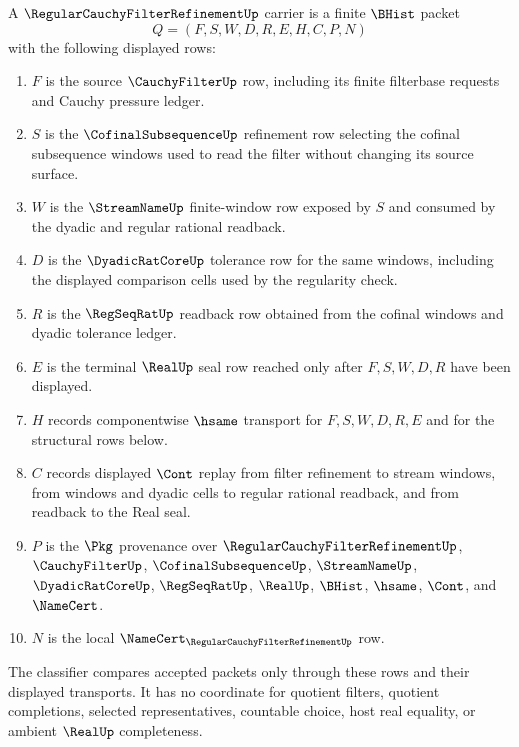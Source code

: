 \begin{definition}
\label{def:regular-cauchy-filter-refinement-carrier}
A $\RegularCauchyFilterRefinementUp$ carrier is a finite $\BHist$ packet
$$
Q=(F,S,W,D,R,E,H,C,P,N)
$$
with the following displayed rows:
\begin{enumerate}
\item $F$ is the source $\CauchyFilterUp$ row, including its finite filterbase requests and Cauchy pressure ledger.
\item $S$ is the $\CofinalSubsequenceUp$ refinement row selecting the cofinal subsequence windows used to read the filter without changing its source surface.
\item $W$ is the $\StreamNameUp$ finite-window row exposed by $S$ and consumed by the dyadic and regular rational readback.
\item $D$ is the $\DyadicRatCoreUp$ tolerance row for the same windows, including the displayed comparison cells used by the regularity check.
\item $R$ is the $\RegSeqRatUp$ readback row obtained from the cofinal windows and dyadic tolerance ledger.
\item $E$ is the terminal $\RealUp$ seal row reached only after $F,S,W,D,R$ have been displayed.
\item $H$ records componentwise $\hsame$ transport for $F,S,W,D,R,E$ and for the structural rows below.
\item $C$ records displayed $\Cont$ replay from filter refinement to stream windows, from windows and dyadic cells to regular rational readback, and from readback to the Real seal.
\item $P$ is the $\Pkg$ provenance over $\RegularCauchyFilterRefinementUp$, $\CauchyFilterUp$, $\CofinalSubsequenceUp$, $\StreamNameUp$, $\DyadicRatCoreUp$, $\RegSeqRatUp$, $\RealUp$, $\BHist$, $\hsame$, $\Cont$, and $\NameCert$.
\item $N$ is the local $\NameCert_{\RegularCauchyFilterRefinementUp}$ row.
\end{enumerate}
The classifier compares accepted packets only through these rows and their displayed transports. It has no coordinate for quotient filters, quotient completions, selected representatives, countable choice, host real equality, or ambient $\RealUp$ completeness.
\end{definition}

